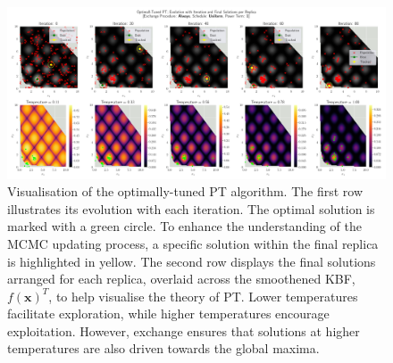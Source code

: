 \documentclass[10pt]{article}
\begin{document}
\begin{figure}[H]
    \centering
    \includegraphics[width=1\textwidth]{../figures/Permanent Images/PT_Optimal_Tuning.png}
    \captionsetup{justification=centering}
    \caption{Visualisation of the optimally-tuned PT algorithm. The first row illustrates its evolution with each iteration. The optimal solution is marked with a green circle. To enhance the understanding of the MCMC updating process, a specific solution within the final replica is highlighted in yellow. The second row displays the final solutions arranged for each replica, overlaid across the smoothened KBF, $f(\mathbf{x})^T$, to help visualise the theory of PT. Lower temperatures facilitate exploration, while higher temperatures encourage exploitation. However, exchange ensures that solutions at higher temperatures are also driven towards the global maxima.}
    \label{fig:PToptimal_evo}
\end{figure}
\end{document}
